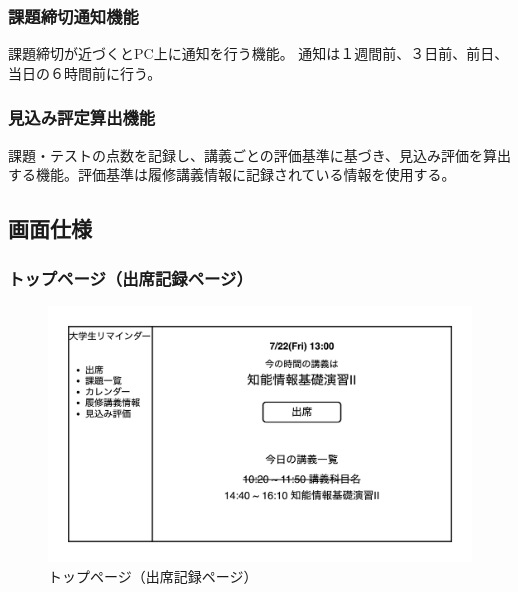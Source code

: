 \documentclass[a4paper, 11pt, titlepage]{jsarticle}
\begin{document}
\subsubsection{課題締切通知機能}
課題締切が近づくとPC上に通知を行う機能。
通知は１週間前、３日前、前日、当日の６時間前に行う。
\subsubsection{見込み評定算出機能}
課題・テストの点数を記録し、講義ごとの評価基準に基づき、見込み評価を算出する機能。評価基準は履修講義情報に記録されている情報を使用する。

\clearpage

\subsection{画面仕様}
\subsubsection{トップページ（出席記録ページ）}
\begin{figure}[htbp]
\begin{center}
\includegraphics[width=120mm]{../img/Top.png}
\caption{トップページ（出席記録ページ）}
\end{center}
\end{figure}

\clearpage
\end{document}
